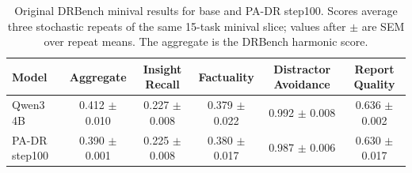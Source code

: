 \begin{table}[t]
\small
\centering
\begin{tabular}{lccccc}
\toprule
Model & Aggregate & Insight Recall & Factuality & Distractor Avoidance & Report Quality \\
\midrule
Qwen3 4B & 0.412 {\scriptsize $\pm$ 0.010} & 0.227 {\scriptsize $\pm$ 0.008} & 0.379 {\scriptsize $\pm$ 0.022} & 0.992 {\scriptsize $\pm$ 0.008} & 0.636 {\scriptsize $\pm$ 0.002} \\
PA-DR step100 & 0.390 {\scriptsize $\pm$ 0.001} & 0.225 {\scriptsize $\pm$ 0.008} & 0.380 {\scriptsize $\pm$ 0.017} & 0.987 {\scriptsize $\pm$ 0.006} & 0.630 {\scriptsize $\pm$ 0.017} \\
\bottomrule
\end{tabular}
\caption{Original DRBench minival results for base \qwenthreeb and PA-DR step100. Scores average three stochastic repeats of the same 15-task minival slice; values after $\pm$ are SEM over repeat means. The aggregate is the DRBench harmonic score.}
\label{tab:drbench_minival_step100}
\end{table}
